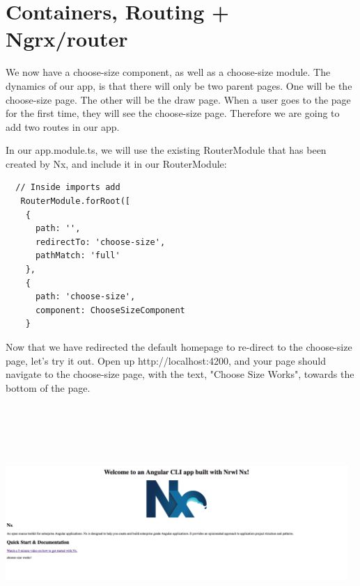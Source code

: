 \maketitle{}
\section{ Containers, Routing + Ngrx/router }

We now have a choose-size component, as well as a choose-size module.
The dynamics of our app, is that there will only be two parent pages. One will
be the choose-size page. The other will be the draw page. When a user goes to
the page for the first time, they will see the choose-size page. Therefore we
are going to add two routes in our app.

In our app.module.ts, we will use the existing RouterModule that has been
created by Nx, and include it in our RouterModule:

\begin{verbatim}
  // Inside imports add
   RouterModule.forRoot([
    {
      path: '',
      redirectTo: 'choose-size',
      pathMatch: 'full'
    },
    {
      path: 'choose-size',
      component: ChooseSizeComponent
    }
\end{verbatim}


Now that we have redirected the default homepage to re-direct to the
choose-size page, let's try it out. Open up http://localhost:4200, and your page
should navigate to the choose-size page, with the text, "Choose Size Works",
towards the bottom of the page.

\includegraphics[width=13cm, height=9cm]{routing/containers-and-routing/choose-size-screenshot}

